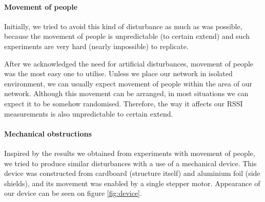 \documentclass[
  print, %
  Table,   %
  nolof,     %
  nolot,     %
           oneside
]{fithesis3}
\begin{document}
  \paragraph{Movement of people}\label{subsubsec:people}
  Initially, we tried to avoid this kind of disturbance as much as was possible, because the movement of people is unpredictable (to certain extend) and such experiments are very hard (nearly impossible) to replicate.

  After we acknowledged the need for artificial disturbances, movement of people was the most easy one to utilise. Unless we place our network in isolated environment, we can usually expect movement of people within the area of our network. Although this movement can be arranged, in most situations we can expect it to be somehow randomised. Therefore, the way it affects our RSSI measurements is also unpredictable to certain extend.

  \paragraph{Mechanical obstructions}\label{subsec:shield}
  Inspired by the results we obtained from experiments with movement of people, we tried to produce similar disturbances with a use of a mechanical device. This device was constructed from cardboard (structure itself) and aluminium foil (side shields), and its movement was enabled by a single stepper motor. Appearance of our device can be seen on figure \ref{fig:device}. %
\end{document}
